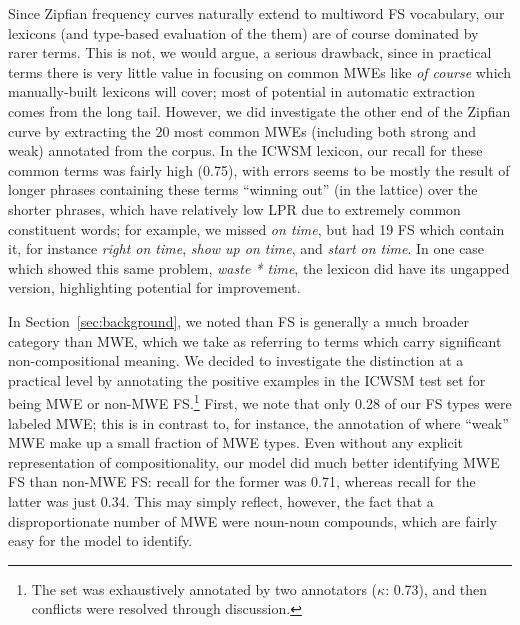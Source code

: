 \documentclass[11pt,letterpaper]{article}
\newcommand{\ex}[1]{\textit{#1}\xspace}
\newcommand{\secref}[2][]{Section#1~\ref{#2}\xspace}
\begin{document}
Since Zipfian frequency curves naturally extend to multiword FS vocabulary, our lexicons (and type-based evaluation of the them) are of course dominated by rarer terms. This is not, we would argue, a serious drawback, since in practical terms there is very little value in focusing on common MWEs like \ex{of course} which manually-built lexicons will cover; most of potential in automatic extraction comes from the long tail. However, we did investigate the other end of the Zipfian curve by extracting the 20 most common MWEs (including both strong and weak) annotated from the  corpus. In the ICWSM lexicon, our recall for these common terms was fairly high (0.75), with errors seems to be mostly the result of longer phrases containing these terms ``winning out'' (in the lattice) over the shorter phrases, which have relatively low LPR due to extremely common constituent words; for example, we missed \ex{on time}, but had 19 FS which contain it, for instance \ex{right on time}, \ex{show up on time}, and \ex{start on time}. In one case which showed this same problem, \ex{waste * time}, the lexicon did have its ungapped version, highlighting potential for improvement. 


In \secref{sec:background}, we noted than FS is generally a much broader category than MWE, which we take as referring to terms which carry significant non-compositional meaning. We decided to investigate the distinction at a practical level by annotating the positive examples in the ICWSM test set for being MWE or non-MWE FS.\footnote{The set was exhaustively annotated by two annotators ($\kappa$: 0.73), and then conflicts were resolved through discussion.} First, we note that only 0.28 of our FS types were labeled MWE; this is in contrast to, for instance, the annotation of  where ``weak'' MWE make up a small fraction of MWE types. Even without any explicit representation of compositionality, our model did much better identifying MWE FS than non-MWE FS: recall for the former was 0.71, whereas recall for the latter was just 0.34. This may simply reflect, however, the fact that a disproportionate number of MWE were noun-noun compounds, which are fairly easy for the model to identify.
\end{document}
